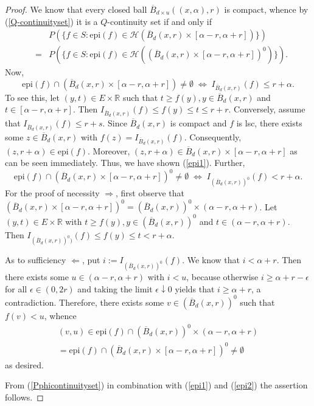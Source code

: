 \documentclass[sn-mathphys,Numbered]{sn-jnl}%
\theoremstyle{thmstyleone}%
\theoremstyle{thmstyletwo}%
\theoremstyle{thmstylethree}%
\begin{document}
\begin{proof} We know that every closed ball $\overline{B}_{d \times u}((x,\alpha),r)$ is compact, whence by (\ref{Q-continuityset}) it is a $Q$-continuity set if and only if
\begin{eqnarray} \label{Pphicontinuityset}
 & &P(\{f \in S: \text{epi}(f) \in \mathcal{H}(\overline{B}_d(x,r) \times [\alpha-r,\alpha+r])\}) \nonumber\\
  &=& P(\{f \in S: \text{epi}(f) \in \mathcal{H}((\overline{B}_d(x,r) \times [\alpha-r,\alpha+r])^0)\}).
\end{eqnarray}
Now,
\begin{equation} \label{epi1}
 \text{epi}(f) \cap (\overline{B}_d(x,r) \times [\alpha-r,\alpha+r]) \neq \emptyset \; \Leftrightarrow \; I_{\overline{B}_d(x,r)}(f) \le r+\alpha.
\end{equation}
To see this, let $(y,t) \in E \times \mathbb{R}$ such that $t \ge f(y), y \in \overline{B}_d(x,r)$ and $t \in [\alpha-r,\alpha+r]$.
Then $I_{\overline{B}_d(x,r)}(f) \le f(y) \le t \le r+r.$ Conversely, assume that $I_{\overline{B}_d(x,r)}(f) \le r+s$. Since
$\overline{B}_d(x,r)$ is compact and $f$ is lsc, there exists some $z \in \overline{B}_d(x,r)$ with $f(z)=I_{\overline{B}_d(x,r)}(f).$
Consequently, $(z,r+\alpha) \in \text{epi}(f)$. Moreover, $(z,r+\alpha) \in \overline{B}_d(x,r) \times [\alpha-r,\alpha+r]$ as can be seen immediately.
Thus, we have shown (\ref{epi1}).
Further,
\begin{equation} \label{epi2}
 \text{epi}(f) \cap (\overline{B}_d(x,r) \times [\alpha-r,\alpha+r])^0 \neq \emptyset \; \Leftrightarrow \; I_{(\overline{B}_d(x,r))^0}(f) < r+\alpha.
\end{equation}
For the proof of necessity $\Rightarrow$, first observe that $(\overline{B}_d(x,r) \times [\alpha-r,\alpha+r])^0=(\overline{B}_d(x,r))^0 \times (\alpha-r,\alpha+r)$.
Let $(y,t) \in E \times \mathbb{R}$ with $t \ge f(y), y \in (\overline{B}_d(x,r))^0$ and $t \in (\alpha-r,\alpha+r)$. Then
$I_{(\overline{B}_d(x,r))^0)}(f) \le f(y) \le t < r+\alpha$.

As to sufficiency $\Leftarrow$, put $i:= I_{(\overline{B}_d(x,r))^0}(f).$
We know that $i< \alpha+r$. Then there exists some $u \in (\alpha-r,\alpha+r)$ with $i<u$, because otherwise $i \ge \alpha+r-\epsilon$ for all $\epsilon \in (0,2r)$ and taking the limit $\epsilon \downarrow 0$ yields that $i \ge \alpha+r$, a contradiction. Therefore, there exists some $v \in (\overline{B}_d(x,r))^0$ such that $f(v)< u$, whence
\begin{align*}
(v,u) \in \text{epi}(f) \cap (\overline{B}_d(x,r))^0 \times (\alpha-r,\alpha+r)\\
    = \text{epi}(f) \cap (\overline{B}_d(x,r) \times [\alpha-r,\alpha+r])^0 \neq \emptyset
\end{align*}
as desired.

From (\ref{Pphicontinuityset}) in combination with (\ref{epi1}) and (\ref{epi2}) the assertion follows.
\end{proof}
\end{document}
